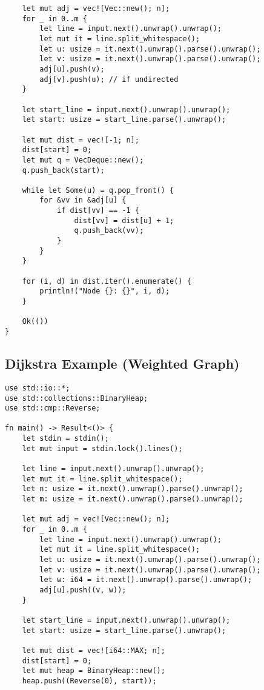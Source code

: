 \documentclass[letterpaper,landscape]{article}
\begin{document}
\begin{multicols*}{3}
\begin{verbatim}
    let mut adj = vec![Vec::new(); n];
    for _ in 0..m {
        let line = input.next().unwrap().unwrap();
        let mut it = line.split_whitespace();
        let u: usize = it.next().unwrap().parse().unwrap();
        let v: usize = it.next().unwrap().parse().unwrap();
        adj[u].push(v);
        adj[v].push(u); // if undirected
    }

    let start_line = input.next().unwrap().unwrap();
    let start: usize = start_line.parse().unwrap();

    let mut dist = vec![-1; n];
    dist[start] = 0;
    let mut q = VecDeque::new();
    q.push_back(start);

    while let Some(u) = q.pop_front() {
        for &vv in &adj[u] {
            if dist[vv] == -1 {
                dist[vv] = dist[u] + 1;
                q.push_back(vv);
            }
        }
    }

    for (i, d) in dist.iter().enumerate() {
        println!("Node {}: {}", i, d);
    }

    Ok(())
}
\end{verbatim}


\subsection*{Dijkstra Example (Weighted Graph)}
\begin{verbatim}
use std::io::*;
use std::collections::BinaryHeap;
use std::cmp::Reverse;

fn main() -> Result<()> {
    let stdin = stdin();
    let mut input = stdin.lock().lines();

    let line = input.next().unwrap().unwrap();
    let mut it = line.split_whitespace();
    let n: usize = it.next().unwrap().parse().unwrap();
    let m: usize = it.next().unwrap().parse().unwrap();

    let mut adj = vec![Vec::new(); n];
    for _ in 0..m {
        let line = input.next().unwrap().unwrap();
        let mut it = line.split_whitespace();
        let u: usize = it.next().unwrap().parse().unwrap();
        let v: usize = it.next().unwrap().parse().unwrap();
        let w: i64 = it.next().unwrap().parse().unwrap();
        adj[u].push((v, w));
    }

    let start_line = input.next().unwrap().unwrap();
    let start: usize = start_line.parse().unwrap();

    let mut dist = vec![i64::MAX; n];
    dist[start] = 0;
    let mut heap = BinaryHeap::new();
    heap.push((Reverse(0), start));


\end{verbatim}
\end{multicols*}
\end{document}
